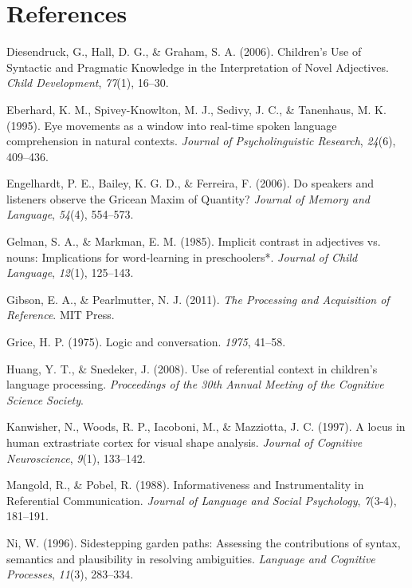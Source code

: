 \documentclass[10pt, letterpaper]{article}
\begin{document}
\section*{References}\label{references}

\hypertarget{refs}{}
\hypertarget{ref-diesendruck_childrens_2006}{}
Diesendruck, G., Hall, D. G., \& Graham, S. A. (2006). Children's Use of
Syntactic and Pragmatic Knowledge in the Interpretation of Novel
Adjectives. \emph{Child Development}, \emph{77}(1), 16--30.

\hypertarget{ref-eberhard_eye_1995}{}
Eberhard, K. M., Spivey-Knowlton, M. J., Sedivy, J. C., \& Tanenhaus, M.
K. (1995). Eye movements as a window into real-time spoken language
comprehension in natural contexts. \emph{Journal of Psycholinguistic
Research}, \emph{24}(6), 409--436.

\hypertarget{ref-engelhardt_speakers_2006}{}
Engelhardt, P. E., Bailey, K. G. D., \& Ferreira, F. (2006). Do speakers
and listeners observe the Gricean Maxim of Quantity? \emph{Journal of
Memory and Language}, \emph{54}(4), 554--573.

\hypertarget{ref-gelman_implicit_1985}{}
Gelman, S. A., \& Markman, E. M. (1985). Implicit contrast in adjectives
vs. nouns: Implications for word-learning in preschoolers*.
\emph{Journal of Child Language}, \emph{12}(1), 125--143.

\hypertarget{ref-gibson_processing_2011}{}
Gibson, E. A., \& Pearlmutter, N. J. (2011). \emph{The Processing and
Acquisition of Reference}. MIT Press.

\hypertarget{ref-grice1975logic}{}
Grice, H. P. (1975). Logic and conversation. \emph{1975}, 41--58.

\hypertarget{ref-huangsnedeker2008}{}
Huang, Y. T., \& Snedeker, J. (2008). Use of referential context in
children's language processing. \emph{Proceedings of the 30th Annual
Meeting of the Cognitive Science Society}.

\hypertarget{ref-kanwisher}{}
Kanwisher, N., Woods, R. P., Iacoboni, M., \& Mazziotta, J. C. (1997). A
locus in human extrastriate cortex for visual shape analysis.
\emph{Journal of Cognitive Neuroscience}, \emph{9}(1), 133--142.

\hypertarget{ref-mangold_informativeness_1988}{}
Mangold, R., \& Pobel, R. (1988). Informativeness and Instrumentality in
Referential Communication. \emph{Journal of Language and Social
Psychology}, \emph{7}(3-4), 181--191.

\hypertarget{ref-nietal}{}
Ni, W. (1996). Sidestepping garden paths: Assessing the contributions of
syntax, semantics and plausibility in resolving ambiguities.
\emph{Language and Cognitive Processes}, \emph{11}(3), 283--334.
\end{document}
